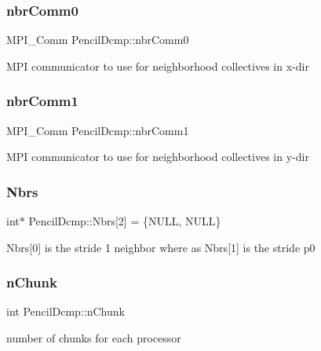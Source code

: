 \subsubsection{\texorpdfstring{nbr\+Comm0}{nbrComm0}}
{\footnotesize\ttfamily M\+P\+I\+\_\+\+Comm Pencil\+Dcmp\+::nbr\+Comm0\hspace{0.3cm}{\ttfamily [protected]}}

M\+PI communicator to use for neighborhood collectives in x-\/dir \mbox{\label{classPencilDcmp_a708235c4b590cb76e8b88b5073828f25}} 
\subsubsection{\texorpdfstring{nbr\+Comm1}{nbrComm1}}
{\footnotesize\ttfamily M\+P\+I\+\_\+\+Comm Pencil\+Dcmp\+::nbr\+Comm1\hspace{0.3cm}{\ttfamily [protected]}}

M\+PI communicator to use for neighborhood collectives in y-\/dir \mbox{\label{classPencilDcmp_a88d5d59f2e15bc6a1e7b4370b757f8ce}} 
\subsubsection{\texorpdfstring{Nbrs}{Nbrs}}
{\footnotesize\ttfamily int$\ast$ Pencil\+Dcmp\+::\+Nbrs\mbox{[}2\mbox{]} = \{N\+U\+LL, N\+U\+LL\}\hspace{0.3cm}{\ttfamily [protected]}}

Nbrs\mbox{[}0\mbox{]} is the stride 1 neighbor where as Nbrs\mbox{[}1\mbox{]} is the stride p0 \mbox{\label{classPencilDcmp_a1f7f54dbd7adbfd03d171c72cbae865e}} 
\subsubsection{\texorpdfstring{n\+Chunk}{nChunk}}
{\footnotesize\ttfamily int Pencil\+Dcmp\+::n\+Chunk\hspace{0.3cm}{\ttfamily [protected]}}

number of chunks for each processor \mbox{\label{classPencilDcmp_aedb528abdba6fa4a541af83f851e11c8}} 
